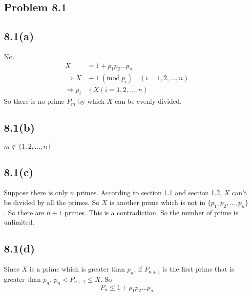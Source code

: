 \documentclass[acmlarge,screen]{acmart}
\begin{document}
\begin{CJK*}{UTF8}{gbsn}
\section{Problem 8.1}
\subsection{8.1(a)}
\label{8.1(a)}
No.
\begin{align*}
	X &= 1+p_1p_2...p_n\\
	\Rightarrow X &\equiv 1\ (\text{mod}\ p_i)\quad(i=1,2,...,n)\\
	\Rightarrow p_i&\nmid X (i=1,2,...,n)
\end{align*}
So there is no prime $P_m$ by which $X$ can be evenly divided.
\subsection{8.1(b)}
\label{8.1(b)}
$m\notin \{1, 2, ..., n\}$
\subsection{8.1(c)}
Suppose there is only $n$ primes. According to section \ref{8.1(a)} and section \ref{8.1(b)}, $X$ can't be divided by all the primes. So $X$ is another prime which is not in $\{p_1,p_2,...,p_n\}$. So there are $n+1$ primes. This is a contradiction. So the number of prime is unlimited.
\subsection{8.1(d)}
Since $X$ is a prime which is greater than $p_n$, if $P_{n+1}$ is the first prime that is greater than $p_n$, $p_n<P_{n+1} \leq X$. So
\begin{displaymath}
	P_n\leq 1+p_1p_2...p_n
\end{displaymath}

\end{CJK*}
\end{document}
